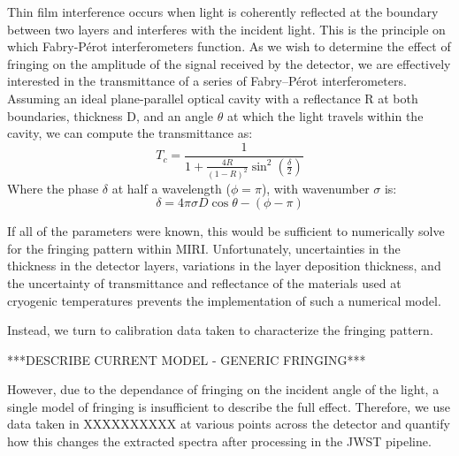 \begin{figure}
	\caption{\label{fig:layers}}
\end{figure}
\begin{table}
	\begin{tabular}{llll}
	\end{tabular}
	\caption{\label{tab:layers}}
\end{table}

Thin film interference occurs when light is coherently reflected at the boundary between two layers and interferes with the incident light.
This is the principle on which Fabry-P\'{e}rot interferometers function.
As we wish to determine the effect of fringing on the amplitude of the signal received by the detector, we are effectively interested in the transmittance of a series of Fabry--P\'{e}rot interferometers. 
Assuming an ideal plane-parallel optical cavity with a reflectance R at both boundaries, thickness D, and an angle $\theta$ at which the light travels within the cavity, we can compute the transmittance as:
\begin{equation}\label{eqn:trans}
T_{c} = \frac{1}{1+\frac{4R}{\left(1-R\right)^{2}}\sin^{2}\left(\frac{\delta}{2}\right)}
\end{equation}
Where the phase $\delta$ at half a wavelength ($\phi = \pi$), with wavenumber $\sigma$ is:
\begin{equation}\label{eqn:phase}
\delta = 4\pi\sigma D \cos\theta - (\phi - \pi)
\end{equation}

If all of the parameters were known, this would be sufficient to numerically solve for the fringing pattern within MIRI. 
Unfortunately, uncertainties in the thickness in the detector layers, variations in the layer deposition thickness, and the uncertainty of transmittance and reflectance of the materials used at cryogenic temperatures prevents the implementation of such a numerical model.

Instead, we turn to calibration data taken to characterize the fringing pattern.

 ***DESCRIBE CURRENT MODEL - GENERIC FRINGING***
 
However, due to the dependance of fringing on the incident angle of the light, a single model of fringing is insufficient to describe the full effect. 
Therefore, we use data taken in XXXXXXXXXX at various points across the detector and quantify how this changes the extracted spectra after processing in the JWST pipeline.


